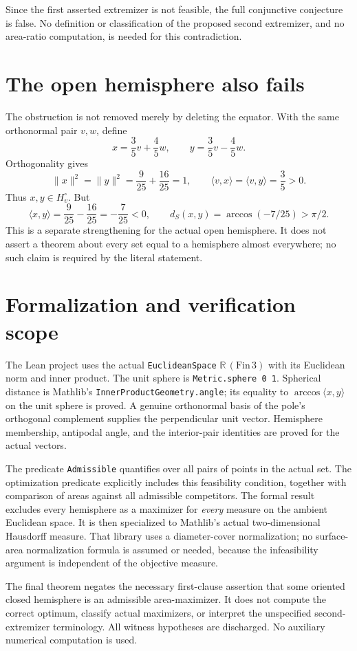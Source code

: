 \documentclass[10pt]{article}
\newcommand{\R}{\mathbb R}
\newcommand{\ip}[2]{\langle #1,#2\rangle}
\begin{document}
Since the first asserted extremizer is not feasible, the full conjunctive conjecture is false. No definition or classification of the proposed second extremizer, and no area-ratio computation, is needed for this contradiction.

\section{The open hemisphere also fails}
The obstruction is not removed merely by deleting the equator. With the same orthonormal pair $v,w$, define
\[
 x=\frac35v+\frac45w,\qquad y=\frac35v-\frac45w.
\]
Orthogonality gives
\[
 \|x\|^2=\|y\|^2=\frac9{25}+\frac{16}{25}=1,
 \qquad \ip{v}{x}=\ip{v}{y}=\frac35>0.
\]
Thus $x,y\in H_v^\circ$. But
\[
 \ip{x}{y}=\frac9{25}-\frac{16}{25}=-\frac7{25}<0,
 \qquad d_S(x,y)=\arccos(-7/25)>\pi/2.
\]
This is a separate strengthening for the actual open hemisphere. It does not assert a theorem about every set equal to a hemisphere almost everywhere; no such claim is required by the literal statement.

\section{Formalization and verification scope}
The Lean project uses the actual \texttt{EuclideanSpace} $\R\,(\mathrm{Fin}\,3)$ with its Euclidean norm and inner product. The unit sphere is \texttt{Metric.sphere 0 1}. Spherical distance is Mathlib's \texttt{InnerProductGeometry.angle}; its equality to $\arccos\ip{x}{y}$ on the unit sphere is proved. A genuine orthonormal basis of the pole's orthogonal complement supplies the perpendicular unit vector. Hemisphere membership, antipodal angle, and the interior-pair identities are proved for the actual vectors.

The predicate \texttt{Admissible} quantifies over all pairs of points in the actual set. The optimization predicate explicitly includes this feasibility condition, together with comparison of areas against all admissible competitors. The formal result excludes every hemisphere as a maximizer for \emph{every} measure on the ambient Euclidean space. It is then specialized to Mathlib's actual two-dimensional Hausdorff measure. That library uses a diameter-cover normalization; no surface-area normalization formula is assumed or needed, because the infeasibility argument is independent of the objective measure.

The final theorem negates the necessary first-clause assertion that some oriented closed hemisphere is an admissible area-maximizer. It does not compute the correct optimum, classify actual maximizers, or interpret the unspecified second-extremizer terminology. All witness hypotheses are discharged. No auxiliary numerical computation is used.
\end{document}

